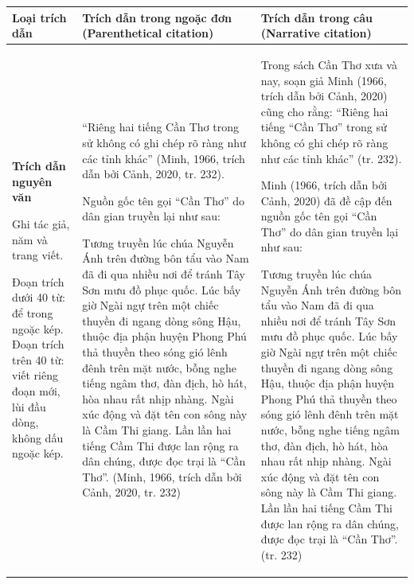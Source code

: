 \documentclass[a4paper,oneside]{thesis}
\begin{document}
 \begin{table}
\centering
\begin{tabular}{|l|l|l|}
    \hline
      Loại trích dẫn   & Trích dẫn trong ngoặc đơn (Parenthetical citation) & Trích dẫn trong câu 
(Narrative citation)
\\
     \hline       
     \textbf{Trích dẫn nguyên văn}
     
Ghi tác giả, năm và trang viết.



Đoạn trích dưới 40 từ: để trong ngoặc kép.
Đoạn trích trên 40 từ: viết riêng đoạn mới, lùi đầu dòng, không dấu ngoặc kép.
    & ``Riêng hai tiếng Cần Thơ trong sử không có ghi chép rõ ràng như các tỉnh khác'' (Minh, 1966, trích dẫn bởi Cảnh, 2020, tr. 232). 


Nguồn gốc tên gọi ``Cần Thơ'' do dân gian truyền lại như sau:

Tương truyền lúc chúa Nguyễn Ánh trên đường bôn tẩu vào Nam đã đi qua nhiều nơi để tránh Tây Sơn mưu đồ phục quốc. Lúc bấy giờ Ngài ngự trên một chiếc thuyền đi ngang dòng sông Hậu, thuộc địa phận huyện Phong Phú thả thuyền theo sóng gió lênh đênh trên mặt nước, bỗng nghe tiếng ngâm thơ, đàn địch, hò hát, hòa nhau rất nhịp nhàng. Ngài xúc động và đặt tên con sông này là Cầm Thi giang. Lần lần hai tiếng Cầm Thi được lan rộng ra dân chúng, được đọc trại là “Cần Thơ”. (Minh, 1966, trích dẫn bởi Cảnh, 2020, tr. 232)
 & Trong sách Cần Thơ xưa và nay, soạn giả Minh (1966, trích dẫn bởi Cảnh, 2020) cũng cho rằng: “Riêng hai tiếng “Cần Thơ” trong sử không có ghi chép rõ ràng như các tỉnh khác” (tr. 232). 

Minh (1966, trích dẫn bởi Cảnh, 2020) đã đề cập đến nguồn gốc tên gọi “Cần Thơ” do dân gian truyền lại như sau:

Tương truyền lúc chúa Nguyễn Ánh trên đường bôn tẩu vào Nam đã đi qua nhiều nơi để tránh Tây Sơn mưu đồ phục quốc. Lúc bấy giờ Ngài ngự trên một chiếc thuyền đi ngang dòng sông Hậu, thuộc địa phận huyện Phong Phú thả thuyền theo sóng gió lênh đênh trên mặt nước, bỗng nghe tiếng ngâm thơ, đàn địch, hò hát, hòa nhau rất nhịp nhàng. Ngài xúc động và đặt tên con sông này là Cầm Thi giang. Lần lần hai tiếng Cầm Thi được lan rộng ra dân chúng, được đọc trại là ``Cần Thơ''. (tr. 232)
\\
         \hline
    \end{tabular}
\end{table}
\end{document}
